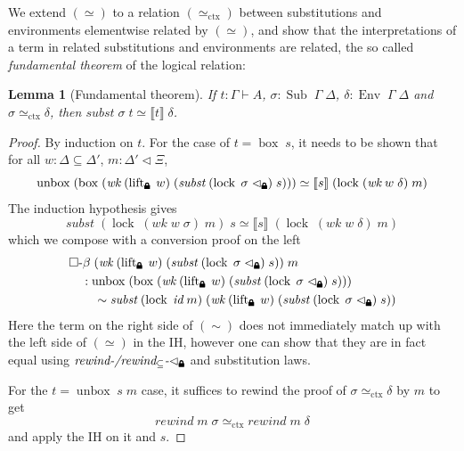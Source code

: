 \documentclass[12pt,twoside,openright]{report}
\numberwithin{equation}{chapter}
\numberwithin{figure}{chapter}
\numberwithin{table}{chapter}
\newtheorem{lemma}[theorem]{Lemma}
\theoremstyle{definition}\newtheorem{definition}{Definition}
\newcommand{\lock}{\text{\tikz[baseline]{
      \fill[rounded corners=.1ex] (-.75ex,0) rectangle (.75ex,1ex);
      \draw[line width=.3ex] (-.4ex,.5ex) -- ++(0,.75ex) arc (180:0:.4ex) -- ++(0,-.75ex);
}}}
\begin{document}
We extend $(\simeq)$ to a relation $(\simeq_\text{ctx})$
between substitutions and environments elementwise related by $(\simeq)$,
and show that
the interpretations of a term in related substitutions and environments are related,
the so called \emph{fundamental theorem} of the logical relation:
\begin{lemma}[Fundamental theorem]
  If $t : \Gamma \vdash A$, $\sigma : \operatorname{Sub} \; \Gamma \; \Delta$,
  $\delta : \operatorname{Env} \; \Gamma \; \Delta$
  and $\sigma \simeq_\text{ctx} \delta$,
  then $\textit{subst} \; \sigma \; t \simeq \llbracket t \rrbracket \; \delta$.
\end{lemma}
\begin{proof}
  By induction on $t$.
  For the case of $t = \operatorname{box} \; s$, it needs to be shown that for all
  $w : \Delta \subseteq \Delta'$, $m : \Delta' \lhd \Xi$,
  \begin{equation*}
    \operatorname{unbox} \; (\operatorname{box} \; (\textit{wk} \; (\operatorname{lift}_\lock \; w) \; (\textit{subst} \; (\operatorname{lock} \; \sigma \; \lhd_\lock) \; s)))
    \simeq \llbracket s \rrbracket \; (\operatorname{lock} \; (\textit{wk} \; w \; \delta) \; m)
  \end{equation*}
  The induction hypothesis gives
  $$ \textit{subst} \; (\operatorname{lock} \; (\textit{wk} \; w \; \sigma) \; m) \; s \simeq \llbracket s \rrbracket \; (\operatorname{lock} \; (\textit{wk} \; w \; \delta) \; m) $$
  which we compose with a conversion proof on the left
  \begin{equation*}
    \begin{split}
      &\Box\text{-}\beta \; (\textit{wk} \; (\operatorname{lift}_\lock \; w) \; (\textit{subst} \; (\operatorname{lock} \; \sigma \; \lhd_\lock) \; s)) \; m \\
      &\quad : \operatorname{unbox} \; (\operatorname{box} \; (\textit{wk} \; (\operatorname{lift}_\lock \; w) \; (\textit{subst} \; (\operatorname{lock} \; \sigma \; \lhd_\lock) \; s))) \\
      &\qquad \sim \textit{subst} \; (\operatorname{lock} \; \textit{id} \; m) \; (\textit{wk} \; (\operatorname{lift}_\lock \; w) \; (\textit{subst} \; (\operatorname{lock} \; \sigma \; \lhd_\lock) \; s))
    \end{split}
  \end{equation*}
  Here the term on the right side of $(\sim)$ does not immediately match up
  with the left side of $(\simeq)$ in the IH,
  however one can show that they are in fact equal
  using $\textit{rewind-/rewind$_\subseteq$-}\lhd_\lock$ and substitution laws.

  For the $t = \operatorname{unbox} \; s \; m$ case,
  it suffices to rewind the proof of $\sigma\simeq_\text{ctx}\delta$ by $m$ to get
  $$ \textit{rewind} \; m \; \sigma \simeq_\text{ctx} \textit{rewind} \; m \; \delta $$
  and apply the IH on it and $s$.
\end{proof}
\end{document}
